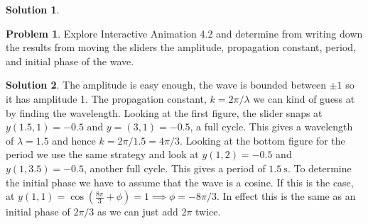 \documentclass[10pt]{article}
\theoremstyle{definition}
\newtheorem{problem}{Problem}
\newtheorem{soln}{Solution}
\newcommand{\bv}[1]{\bm{\mathrm{#1}}}
\begin{document}
\begin{soln}
\begin{enumerate}[label=(\alph*)]
\begin{center}
{
              }
          \end{center}
  \end{enumerate}

\end{soln}


\begin{problem}
Explore Interactive Animation 4.2 and determine from writing down the results from moving the sliders the amplitude, propagation constant, period, and initial phase of the wave.
\end{problem}
\begin{soln}
  The amplitude is easy enough, the wave is bounded between $\pm1$ so it has amplitude 1. The propagation constant, $k=2\pi/\lambda$ we can kind of guess at by finding the wavelength.
  Looking at the first figure, the slider snaps at $y(1.5,1)=-0.5$ and $y=(3,1)=-0.5$, a full cycle. This gives a wavelength of
  $\lambda=1.5$ and hence $k=2\pi/1.5=4\pi/3$. Looking at the bottom figure for the period we use the same strategy and look at
  $y(1,2)=-0.5$ and $y(1,3.5)=-0.5$, another full cycle. This gives a period of $\qty{1.5}{\second}$. To determine the initial phase we have to
  assume that the wave is a cosine. If this is the case, at $y(1,1)=\cos(\frac{8\pi}{3}+\phi)=1\implies\phi=-8\pi/3$. In effect this is the same as an
  initial phase of $2\pi/3$ as we can just add $2\pi$ twice.
\end{soln}
\end{document}
